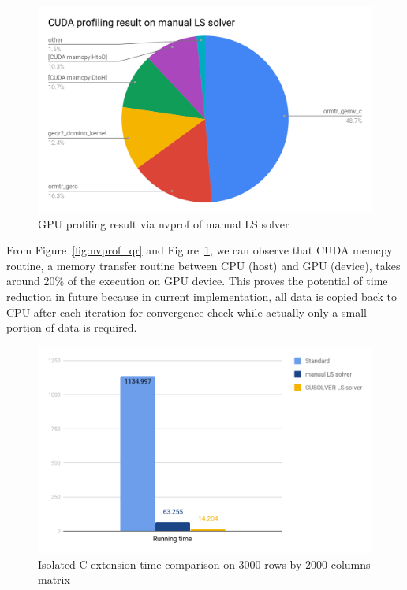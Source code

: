 \documentclass[English]{dicomopapers}
\begin{document}
\begin{figure}[ht]
  \vspace*{-0.2cm}
  \centering
  \includegraphics[width=\columnwidth,natwidth=1200,natheight=742]{nvprof_manual.png}
  \caption{GPU profiling result via nvprof of manual LS solver}\label{fig:nvprof_manual}
\end{figure}
From Figure~\ref{fig:nvprof_qr} and Figure~\ref{fig:nvprof_manual}, we can observe that CUDA memcpy routine, a memory transfer routine between CPU (host) and GPU (device), takes around 20\% of the execution on GPU device. This proves the potential of time reduction in future because in current implementation, all data is copied back to CPU after each iteration for convergence check while actually only a small portion of data is required.\newline

\begin{figure}[ht]
  \vspace*{-1.2cm}
  \centering
  \includegraphics[width=\columnwidth,natwidth=1200,natheight=742]{c_square.png}
  \caption{Isolated C extension time comparison on 3000 rows by 2000 columns matrix}\label{fig:c_square}
\end{figure}
\end{document}
